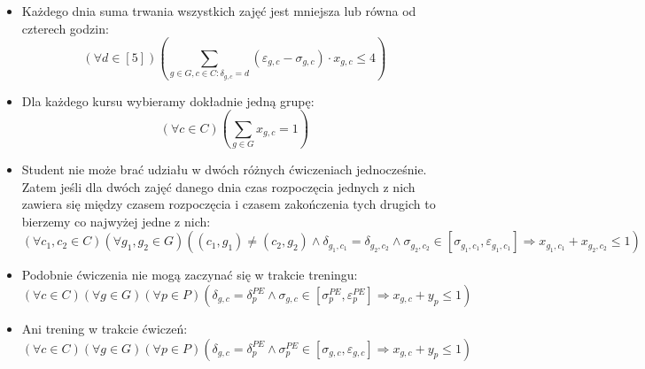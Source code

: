\documentclass{article}
\begin{document}
\begin{itemize}
    \item Każdego dnia suma trwania wszystkich zajęć jest mniejsza lub równa od czterech godzin:
    $$\left(\forall d \in [5]\right) \left(\sum_ {g \in G, c \in C : \delta_{g,c} = d} (\varepsilon_{g,c} - \sigma_{g,c}) \cdot x_{g,c} \leq 4\right)$$
    
    \item Dla każdego kursu wybieramy dokładnie jedną grupę:
    $$\left(\forall c \in C\right) \left(\sum_ {g \in G} x_{g,c} = 1\right)$$

    \item Student nie może brać udziału w dwóch różnych ćwiczeniach jednocześnie. Zatem jeśli dla dwóch zajęć danego dnia czas rozpoczęcia jednych z nich zawiera się między czasem rozpoczęcia i czasem zakończenia tych drugich to bierzemy co najwyżej jedne z nich:
    \small 
    $$
    \left(\forall c_1,c_2 \in C\right) 
    \left(\forall g_1,g_2 \in G\right) 
    \left(
    (c_1,g_1) \neq (c_2,g_2) \land 
    \delta_{g_1,c_1} = \delta_{g_2,c_2} \land 
    \sigma_{g_2, c_2} \in [ \sigma_{g_1, c_1}, \varepsilon_{g_1, c_1}] 
    \Rightarrow
    x_{g_1,c_1} + x_{g_2,c_2} \leq 1 
    \right)$$

    \item Podobnie ćwiczenia nie mogą zaczynać się w trakcie treningu:
    \small 
    $$
    \left(\forall c \in C\right) 
    \left(\forall g \in G\right) 
    \left(\forall p \in P \right) 
    \left(
    \delta_{g,c} = \delta^{PE}_{p} \land 
    \sigma_{g,c} \in [ \sigma^{PE}_{p}, \varepsilon^{PE}_{p}] 
    \Rightarrow
    x_{g,c} + y_p \leq 1 
    \right)$$

    \item Ani trening w trakcie ćwiczeń:
    \small 
    $$
    \left(\forall c \in C\right) 
    \left(\forall g \in G\right) 
    \left(\forall p \in P \right) 
    \left(
    \delta_{g,c} = \delta^{PE}_{p} \land 
    \sigma^{PE}_{p} \in [ \sigma_{g,c}, \varepsilon_{g,c}] 
    \Rightarrow
    x_{g,c} + y_p \leq 1 
    \right)$$


\end{itemize}
\end{document}
